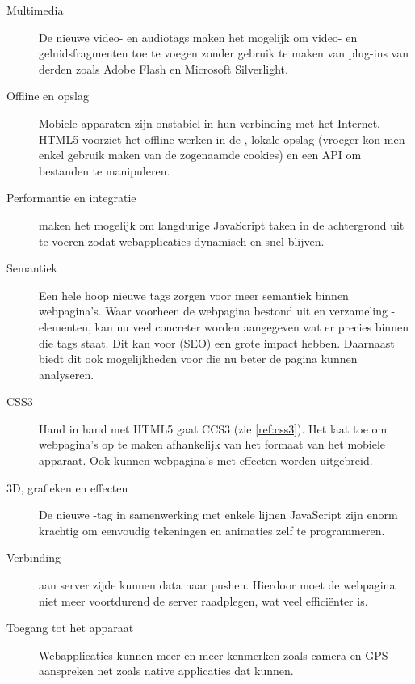 \begin{description}
\item [Multimedia] De nieuwe video- en audiotags maken het mogelijk om video- en geluidsfragmenten toe te voegen zonder gebruik te maken van plug-ins van derden zoals Adobe Flash en Microsoft Silverlight.

\item [Offline en opslag]  Mobiele apparaten zijn onstabiel in hun verbinding met het Internet. HTML5 voorziet het offline werken in de , lokale opslag (vroeger kon men enkel gebruik maken van de zogenaamde cookies) en een API om bestanden te manipuleren.

\item [Performantie en integratie]   maken het mogelijk om langdurige JavaScript taken in de achtergrond uit te voeren zodat webapplicaties dynamisch en snel blijven.

\item [Semantiek]  Een hele hoop nieuwe tags zorgen voor meer semantiek binnen webpagina's. Waar voorheen de webpagina bestond uit en verzameling -elementen, kan nu veel concreter worden aangegeven wat er precies binnen die tags staat. Dit kan voor  (SEO) een grote impact hebben. Daarnaast biedt dit ook mogelijkheden voor  die nu beter de pagina kunnen analyseren.

\item [CSS3]  Hand in hand met HTML5 gaat CCS3 (zie \ref{ref:css3}). Het laat toe om webpagina's op te maken afhankelijk van het formaat van het mobiele apparaat. Ook kunnen webpagina's met effecten worden uitgebreid. 

\item [3D, grafieken en effecten]  De nieuwe -tag in samenwerking met enkele lijnen JavaScript zijn enorm krachtig om eenvoudig tekeningen en animaties zelf te programmeren.

\item [Verbinding]   aan server zijde kunnen data naar  pushen. Hierdoor moet de webpagina niet meer voortdurend de server raadplegen, wat veel efficiënter is.

\item [Toegang tot het apparaat] Webapplicaties kunnen meer en meer kenmerken zoals camera en GPS aanspreken net zoals native applicaties dat kunnen. 
\end{description}


